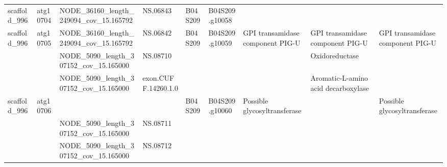 \begin{longtable}{lllllllll}
   scaffold\_996 &  atg10704 &  NODE\_36160\_length\_249094\_cov\_15.165792 &              NS.06843 &      B04S209 &  B04S209.g10058 &                                                                                 &                                                                                 &                                                                                 \\
   scaffold\_996 &  atg10705 &  NODE\_36160\_length\_249094\_cov\_15.165792 &              NS.06842 &      B04S209 &  B04S209.g10059 &                                                GPI transamidase component PIG-U &                                                GPI transamidase component PIG-U &                                                GPI transamidase component PIG-U \\
                &           &   NODE\_5090\_length\_307152\_cov\_15.165000 &              NS.08710 &              &                 &                                                                                 &                                                                  Oxidoreductase &                                                                                 \\
                &           &   NODE\_5090\_length\_307152\_cov\_15.165000 &   exon.CUFF.14260.1.0 &              &                 &                                                                                 &                                             Aromatic-L-amino acid decarboxylase &                                                                                 \\
   scaffold\_996 &  atg10706 &                                         &                       &      B04S209 &  B04S209.g10060 &                                                    Possible glycosyltransferase &                                                                                 &                                                    Possible glycosyltransferase \\
                &           &   NODE\_5090\_length\_307152\_cov\_15.165000 &              NS.08711 &              &                 &                                                                                 &                                                                                 &                                                                                 \\
                &           &   NODE\_5090\_length\_307152\_cov\_15.165000 &              NS.08712 &              &                 &                                                                                 &                                                                                 &                                                                                 \\

\end{longtable}
